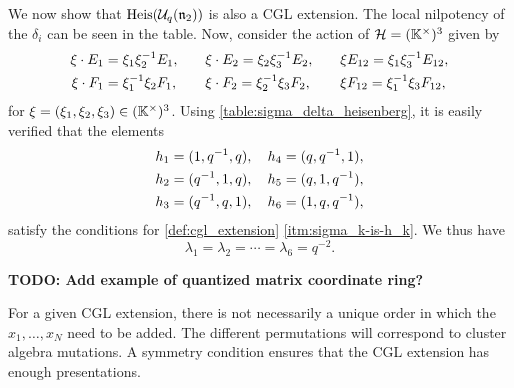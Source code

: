 \begin{example}
	We now show that $\operatorname{Heis}(\mathcal{U}_q(\mathfrak{n}_2))$ is also a CGL extension. The local nilpotency of the $\delta_i$
	can be seen in the table. Now, consider the action of $\mathcal{H} = (\mathbb{K}^\times)^3$ given by
	\begin{align*}
		\xi \cdot E_1 & = \xi_1\xi_2^{-1} E_1, \quad &  & \xi \cdot E_2 = \xi_2\xi_3^{-1} E_2, \quad &  & \xi E_{12} = \xi_1 \xi_3^{-1} E_{12}, \\
		\xi \cdot F_1 & = \xi_1^{-1}\xi_2F_1, \quad  &  & \xi \cdot F_2 = \xi_2^{-1}\xi_3 F_2, \quad  &  & \xi F_{12} = \xi_1^{-1} \xi_3 F_{12},
	\end{align*}
	for $\xi = (\xi_1, \xi_2, \xi_3) \in (\mathbb{K}^\times)^3$. Using \cref{table:sigma_delta_heisenberg}, it is easily
	verified that the elements
	\begin{align*}
		h_1 & = (1, q^{-1}, q), \quad h_4 = (q, q^{-1}, 1), \\
		h_2 & = (q^{-1},1, q), \quad h_5 = (q,1, q^{-1}),   \\
		h_3 & = (q^{-1}, q, 1), \quad h_6 = (1, q, q^{-1}),
	\end{align*}
	satisfy the conditions for \cref{def:cgl_extension} \cref{itm:sigma_k-is-h_k}. We thus have
	\begin{equation}\label{eq:heisenberg_lambda_k}
		\lambda_1 = \lambda_2 = \cdots = \lambda_6 = q^{-2}.
	\end{equation}
\end{example}

\textbf{TODO: Add example of quantized matrix coordinate ring?}

For a given CGL extension, there is not necessarily a unique order in which the $x_1,
	\dots, x_N$ need to be added. The different permutations will correspond to cluster
algebra mutations. A symmetry condition ensures that the CGL extension has enough
presentations.

